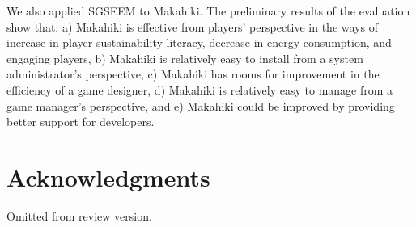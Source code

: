 \documentclass{sigchi}
\begin{document}
We also applied SGSEEM to Makahiki. The preliminary results of the evaluation show
that: a) Makahiki is effective from players' perspective in the ways of increase
 in player sustainability literacy, decrease in energy consumption, and engaging
 players, b) Makahiki is relatively easy to install from a system administrator's
 perspective, c) Makahiki has rooms for improvement in the efficiency of a game
 designer, d) Makahiki is relatively easy to manage from a game manager's perspective,
 and e) Makahiki could be improved by providing better support for developers.

\section{Acknowledgments}
Omitted from review version.


%
%
%
%
%
\balance



\end{document}
